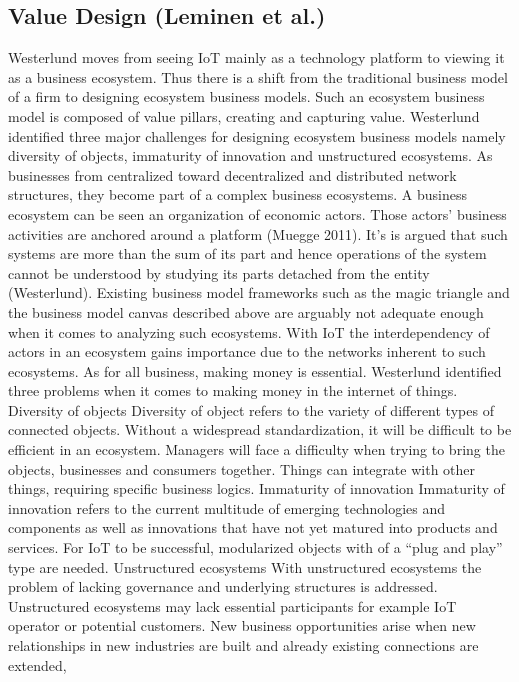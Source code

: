		\subsection{Value Design (Leminen et al.)}
		Westerlund moves from seeing IoT mainly as a technology platform to viewing it as a business ecosystem. Thus there is a shift from the traditional business model of a firm to designing ecosystem business models. Such an ecosystem business model is composed of value pillars, creating and capturing value. Westerlund identified three major challenges for designing ecosystem business models namely diversity of objects, immaturity of innovation and unstructured ecosystems.
As businesses from centralized toward decentralized and distributed network structures, they become part of a complex business ecosystems. A business ecosystem can be seen an organization of economic actors. Those actors' business activities are anchored around a platform (Muegge 2011). It's is argued that such systems are more than the sum of its part and hence operations of the system cannot be understood by studying its parts detached from the entity (Westerlund).
Existing business model frameworks such as the magic triangle and the business model canvas described above are arguably not adequate enough when it comes to analyzing such ecosystems. With IoT the interdependency of actors in an ecosystem gains importance due to the networks inherent to such ecosystems.
As for all business, making money is essential. Westerlund identified three problems when it comes to making money in the internet of things.
Diversity of objects
Diversity of object refers to the variety of different types of connected objects. Without a widespread standardization, it will be difficult to be efficient in an ecosystem. Managers will face a difficulty when trying to bring the objects, businesses and consumers together. Things can integrate with other things, requiring specific business logics.
Immaturity of innovation
Immaturity of innovation refers to the current multitude of emerging technologies and components as well as innovations that have not yet matured into products and services. For IoT to be successful, modularized objects with of a ``plug and play'' type are needed.
Unstructured ecosystems
With unstructured ecosystems the problem of lacking governance and underlying structures is addressed. Unstructured ecosystems may lack essential participants for example IoT operator or potential customers. New business opportunities arise when new relationships in new industries are built and already existing connections are extended,

